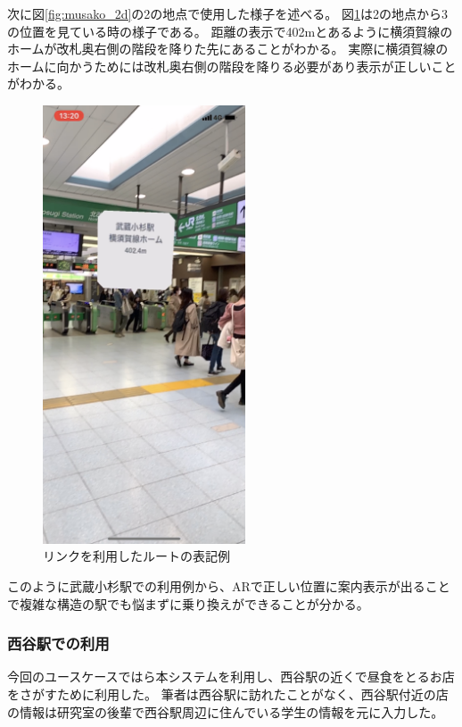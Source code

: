 次に図\ref{fig:musako_2d}の\textcircled{\scriptsize{2}}の地点で使用した様子を述べる。
図\ref{fig:musako_jr_ar1}は\textcircled{\scriptsize{2}}の地点から\textcircled{\scriptsize{3}}の位置を見ている時の様子である。
距離の表示で402mとあるように横須賀線のホームが改札奥右側の階段を降りた先にあることがわかる。
実際に横須賀線のホームに向かうためには改札奥右側の階段を降りる必要があり表示が正しいことがわかる。

\begin{figure}[h]
  \centering
  \includegraphics[width=60mm]{images/musako_jr_ar1.png}
  \caption{リンクを利用したルートの表記例} \label{fig:musako_jr_ar1}
\end{figure}
このように武蔵小杉駅での利用例から、ARで正しい位置に案内表示が出ることで複雑な構造の駅でも悩まずに乗り換えができることが分かる。


\subsubsection{西谷駅での利用}
今回のユースケースではら本システムを利用し、西谷駅の近くで昼食をとるお店をさがすために利用した。
筆者は西谷駅に訪れたことがなく、西谷駅付近の店の情報は研究室の後輩で西谷駅周辺に住んでいる学生の情報を元に入力した。

